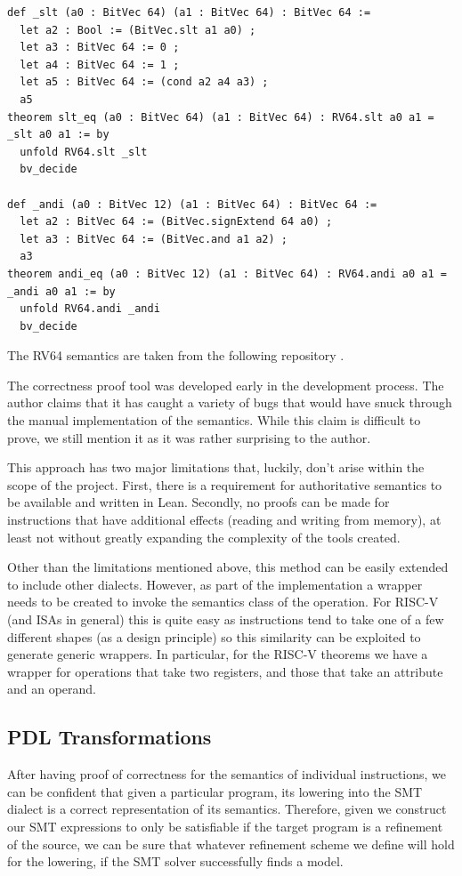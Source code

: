 \begin{verbatim}
def _slt (a0 : BitVec 64) (a1 : BitVec 64) : BitVec 64 :=
  let a2 : Bool := (BitVec.slt a1 a0) ;
  let a3 : BitVec 64 := 0 ;
  let a4 : BitVec 64 := 1 ;
  let a5 : BitVec 64 := (cond a2 a4 a3) ;
  a5
theorem slt_eq (a0 : BitVec 64) (a1 : BitVec 64) : RV64.slt a0 a1 = _slt a0 a1 := by
  unfold RV64.slt _slt
  bv_decide

def _andi (a0 : BitVec 12) (a1 : BitVec 64) : BitVec 64 :=
  let a2 : BitVec 64 := (BitVec.signExtend 64 a0) ;
  let a3 : BitVec 64 := (BitVec.and a1 a2) ;
  a3
theorem andi_eq (a0 : BitVec 12) (a1 : BitVec 64) : RV64.andi a0 a1 = _andi a0 a1 := by
  unfold RV64.andi _andi
  bv_decide
\end{verbatim}
The RV64 semantics are taken from the following repository \cite{riscv-lean}.

The correctness proof tool was developed early in the development process. The 
author claims that it has caught a variety of bugs that would have snuck through the manual 
implementation of the semantics. While this claim is difficult to prove, we still mention
it as it was rather surprising to the author.

This approach has two major limitations that, luckily, don't arise within the scope of the 
project. First, there is a requirement for authoritative semantics to be available and written
in Lean. Secondly, no proofs can be made for instructions that have additional effects (reading
and writing from memory), at least not without greatly expanding the complexity of the tools
created.

Other than the limitations mentioned above, this method can be easily extended to include
other dialects. However, as part of the implementation a wrapper needs to be created 
to invoke the semantics class of the operation. For RISC-V (and ISAs in general) this is
quite easy as instructions tend to take one of a few different shapes (as a design principle)
so this similarity can be exploited to generate generic wrappers. In particular, for the RISC-V
theorems we have a wrapper for operations that take two registers, and those that take an 
attribute and an operand.


\subsection{PDL Transformations}

After having proof of correctness for the semantics of individual instructions, we can be confident
that given a particular program, its lowering into the SMT dialect is a correct representation
of its semantics. Therefore, given we construct our SMT expressions to only be satisfiable if
the target program is a refinement of the source, we can be sure that whatever refinement scheme
we define will hold for the lowering, if the SMT solver successfully finds a model.

